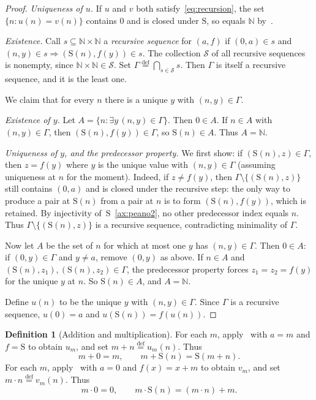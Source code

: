 \documentclass[11pt,reqno]{amsart}
\theoremstyle{plain}
\theoremstyle{definition}
\newtheorem{definition}[theorem]{Definition}
\theoremstyle{remark}
\newcommand{\N}{\mathbb{N}}
\newcommand{\Suc}{\mathrm{S}}
\newcommand{\eqdef}{\stackrel{\mathrm{def}}{=}}
\numberwithin{equation}{section}
\begin{document}
\begin{proof}
\textit{Uniqueness of \(u\).}
If \(u\) and \(v\) both satisfy~\eqref{eq:recursion}, the set
\(\{n:u(n)=v(n)\}\) contains \(0\) and is closed under \(\Suc\), so
equals \(\N\) by~.

\medskip
\noindent\textit{Existence.}
Call \(s\subseteq\N\times\N\) a \emph{recursive sequence} for
\((a,f)\) if \((0,a)\in s\) and
\((n,y)\in s\Rightarrow(\Suc(n),f(y))\in s\). The collection
\(\mathcal{S}\) of all recursive sequences is nonempty, since
\(\N\times\N\in\mathcal{S}\). Set
\(\Gamma\eqdef\bigcap_{s\in\mathcal{S}}s\). Then \(\Gamma\) is itself
a recursive sequence, and it is the least one.

We claim that for every \(n\) there is a unique \(y\) with
\((n,y)\in\Gamma\).

\textit{Existence of \(y\).}
Let \(A=\{n:\exists y\,(n,y)\in\Gamma\}\). Then \(0\in A\). If
\(n\in A\) with \((n,y)\in\Gamma\), then
\((\Suc(n),f(y))\in\Gamma\), so \(\Suc(n)\in A\). Thus \(A=\N\).

\textit{Uniqueness of \(y\), and the predecessor property.}
We first show: if \((\Suc(n),z)\in\Gamma\), then
\(z=f(y)\) where \(y\) is the unique value with \((n,y)\in\Gamma\)
(assuming uniqueness at \(n\) for the moment). Indeed, if
\(z\neq f(y)\), then \(\Gamma\setminus\{(\Suc(n),z)\}\) still contains
\((0,a)\) and is closed under the recursive step: the only way to
produce a pair at \(\Suc(n)\) from a pair at \(n\) is to form
\((\Suc(n),f(y))\), which is retained. By injectivity
of~\(\Suc\)~\eqref{ax:peano2}, no other predecessor index equals \(n\).
Thus \(\Gamma\setminus\{(\Suc(n),z)\}\) is a recursive sequence,
contradicting minimality of \(\Gamma\).

Now let \(A\) be the set of \(n\) for which at most one \(y\) has
\((n,y)\in\Gamma\). Then \(0\in A\): if \((0,y)\in\Gamma\) and
\(y\neq a\), remove \((0,y)\) as above. If \(n\in A\) and
\((\Suc(n),z_1),(\Suc(n),z_2)\in\Gamma\), the predecessor property
forces \(z_1=z_2=f(y)\) for the unique \(y\) at \(n\). So
\(\Suc(n)\in A\), and \(A=\N\).

Define \(u(n)\) to be the unique \(y\) with \((n,y)\in\Gamma\). Since
\(\Gamma\) is a recursive sequence, \(u(0)=a\) and
\(u(\Suc(n))=f(u(n))\).
\end{proof}

\begin{definition}[Addition and multiplication]
\label{def:add-mul}
For each \(m\), apply~ with \(a=m\) and \(f=\Suc\)
to obtain \(u_m\), and set \(m+n\eqdef u_m(n)\). Thus
\begin{equation}
\label{eq:add}
  m+0=m,\qquad m+\Suc(n)=\Suc(m+n).
\end{equation}
For each \(m\), apply~ with \(a=0\) and
\(f(x)=x+m\) to obtain \(v_m\), and set \(m\cdot n\eqdef v_m(n)\). Thus
\begin{equation}
\label{eq:mul}
  m\cdot 0=0,\qquad m\cdot\Suc(n)=(m\cdot n)+m.
\end{equation}
\end{definition}
\end{document}
